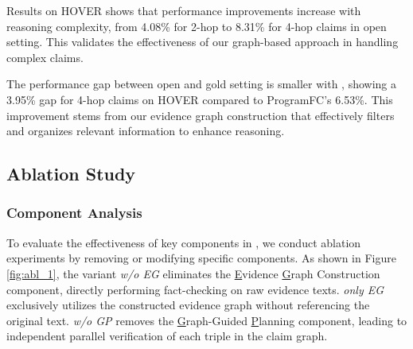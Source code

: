  Results on HOVER shows that performance improvements increase with reasoning complexity, from 4.08\% for 2-hop to 8.31\% for 4-hop claims in open setting. This validates the effectiveness of our graph-based approach in handling complex claims.

The performance gap between open and gold setting is smaller with {\MyFC}, showing a 3.95\% gap for 4-hop claims on HOVER compared to ProgramFC's 6.53\%. This improvement stems from our evidence graph construction that effectively filters and organizes relevant information to enhance reasoning.


\subsection{Ablation Study}\label{sec:ablation_study}

\subsubsection{Component Analysis}\label{Component_Analysis}
To evaluate the effectiveness of key components in {\MyFC}, we conduct ablation experiments by removing or modifying specific components. As shown in Figure \ref{fig:abl_1}, the variant \textit{w/o EG} eliminates the \underline{E}vidence \underline{G}raph Construction component, directly performing fact-checking on raw evidence texts. \textit{only EG} exclusively utilizes the constructed evidence graph without referencing the original text. \textit{w/o GP} removes the \underline{G}raph-Guided \underline{P}lanning component, leading to independent parallel verification of each triple in the claim graph. 

